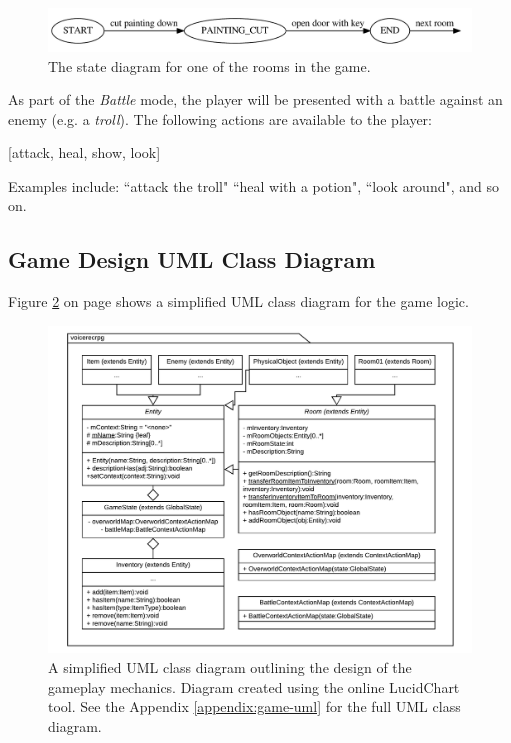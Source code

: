 \documentclass[11pt]{article}
\begin{document}
\begin{center}
\begin{figure}[H]
\begin{center}
  \includegraphics[width=\linewidth]{room1-fsa.pdf}
  \caption{The state diagram for one of the rooms in the game.}
  \label{fig:room1-fsa}
  \end{center}
\end{figure}
\end{center}

As part of the \textit{Battle} mode, the player will be presented with a battle against an enemy (e.g. a \textit{troll}). The following actions are available to the player:

\begin{center}
[attack, heal, show, look]
\end{center}

Examples include: ``attack the troll" ``heal with a potion", ``look around", and so on.

\subsection{Game Design UML Class Diagram}

Figure \ref{fig:game-overview} on page \pageref{fig:game-overview} shows a simplified UML class diagram for the game logic.
\\
\begin{figure}
\begin{center}
  \includegraphics[width=\linewidth]{game-overview.pdf}
  \caption{A simplified UML class diagram outlining the design of the gameplay mechanics. Diagram created using the online LucidChart tool. See the Appendix \ref{appendix:game-uml} for the full UML class diagram.}
  \label{fig:game-overview}
  \end{center}
\end{figure}
\end{document}
